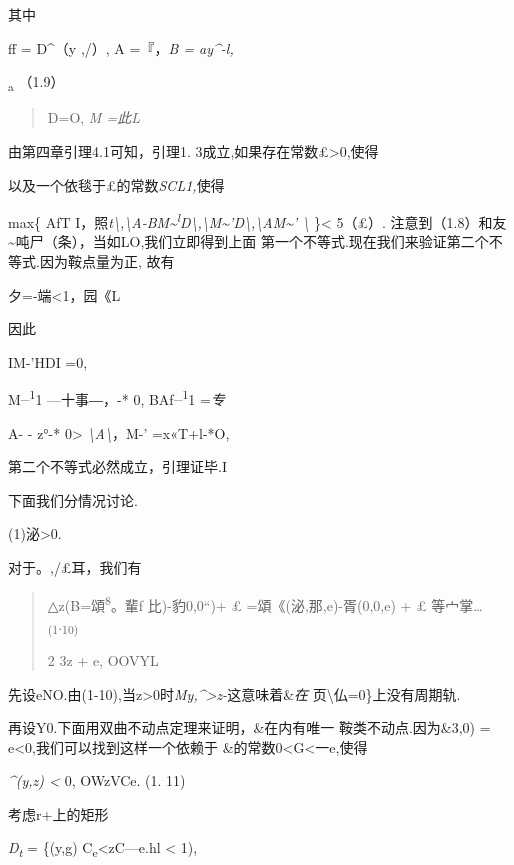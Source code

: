 \documentclass{article}
\begin{document}
其中

ff = D\^{}（y ,/）, A =『，\emph{B = ay\^{}-l,}

\textsubscript{a} （1.9）

\begin{quote}
D=O, \emph{M =此L}
\end{quote}

由第四章引理4.1可知，引理1. 3成立,如果存在常数£\textgreater{}0,使得

以及一个依毯于£的常数\emph{SCL1,}使得

max\{ \textbar{}AfT
I，照\emph{t\textbackslash{},\textbackslash{}A-BM\textasciitilde{}\textsuperscript{l}D\textbackslash{},\textbackslash{}M\textasciitilde{}'D\textbackslash{},\textbackslash{}AM\textasciitilde{}'
\textbackslash{}} \}\textless{} 5（£）.
注意到（1.8）和友\textasciitilde{}吨尸（条），当如LO,我们立即得到上面
第一个不等式.现在我们来验证第二个不等式.因为鞍点量为正, 故有

夕=-端\textless{}1，园《L

因此

IM-'HDI =0,

\textbar{}M\textsuperscript{\_1}1 ---十事―，-* 0,
\textbar{}BAf\textsuperscript{\_1}1 =\emph{专}

\textbar{}A- - z°-* 0\textgreater{}
\emph{\textbackslash{}A\textbackslash{}}，\textbar{}M-'\textbar{}
=x«T+l-*O,

第二个不等式必然成立，引理证毕.I

下面我们分情况讨论.

(1)泌\textgreater{}0.

对于。,/£耳，我们有

\begin{quote}
△z(B=頌\textsuperscript{8}。輩f 比)-豹0,0``)+ £ =頌《(泌,那,e)-胥(0,0,e)
+ £ 等宀掌\ldots{} \textsubscript{(1}.\textsubscript{10)}

2 3z + e, OOVYL
\end{quote}

先设eNO.由(1-10),当z\textgreater{}0时\emph{My,\^{}\textgreater{}z-}这意味着\&\emph{在}
页\textbackslash{}仏=0\}上没有周期轨.

再设Y0.下面用双曲不动点定理来证明，\&在内有唯一 鞍类不动点.因为\&3,0) =
e\textless{}0,我们可以找到这样一个依赖于
\&的常数0\textless{}G\textless{}一e,使得

\emph{\^{}(y,z) \textless{}} 0, OWzVCe. (1. 11)

考虑r+上的矩形

\emph{D\textsubscript{t}} = \{(y,g)
\textbar{}C\textsubscript{e}\textless{}zC---e.hl \textless{} 1),
\end{document}
